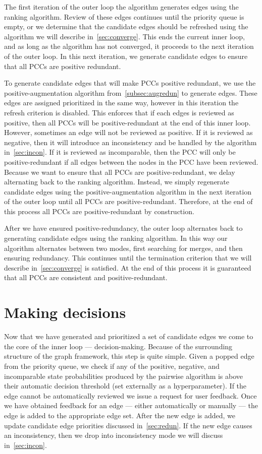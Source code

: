 The first iteration of the outer loop the algorithm generates edges using the ranking algorithm.
Review of these edges continues until the priority queue is empty, or we determine that the candidate edges
  should be refreshed using the algorithm we will describe in~\cref{sec:converge}.
This ends the current inner loop, and as long as the algorithm has not converged, it proceeds to the next
  iteration of the outer loop.
In this next iteration, we generate candidate edges to ensure that all PCCs are positive redundant.

To generate candidate edges that will make PCCs positive redundant, we use the positive-augmentation algorithm
  from~\cref{subsec:augredun} to generate edges.
These edges are assigned prioritized in the same way, however in this iteration the refresh criterion is
  disabled.
This enforces that if each edges is reviewed as positive, then all PCCs will be positive-redundant at the end of
  this inner loop.
However, sometimes an edge will not be reviewed as positive.
If it is reviewed as negative, then it will introduce an inconsistency and be handled by the algorithm
  in~\cref{sec:incon}.
If it is reviewed as incomparable, then the PCC will only be positive-redundant if all edges between the nodes in
  the PCC have been reviewed.
Because we want to ensure that all PCCs are positive-redundant, we delay alternating back to the ranking
  algorithm.
Instead, we simply regenerate candidate edges using the positive-augmentation algorithm in the next iteration of
  the outer loop until all PCCs are positive-redundant.
Therefore, at the end of this process all PCCs are positive-redundant by construction.

After we have ensured positive-redundancy, the outer loop alternates back to generating candidate edges using the
  ranking algorithm.
In this way our algorithm alternates between two modes, first searching for merges, and then ensuring redundancy.
This continues until the termination criterion that we will describe in~\cref{sec:converge} is satisfied.
At the end of this process it is guaranteed that all PCCs are consistent and positive-redundant.


\section{Making decisions}\label{sec:decision}

Now that we have generated and prioritized a set of candidate edges we come to the core of the inner loop ---
  decision-making.
Because of the surrounding structure of the graph framework, this step is quite simple.
Given a popped edge from the priority queue, we check if any of the positive, negative, and incomparable state
  probabilities produced by the pairwise algorithm is above their automatic decision threshold (set externally as a
  hyperparameter).
If the edge cannot be automatically reviewed we issue a request for user feedback.
Once we have obtained feedback for an edge --- either automatically or manually --- the edge is added to the
  appropriate edge set.
After the new edge is added, we update candidate edge priorities discussed in~\cref{sec:redun}.
If the new edge causes an inconsistency, then we drop into inconsistency mode we will discuss
  in~\cref{sec:incon}.

